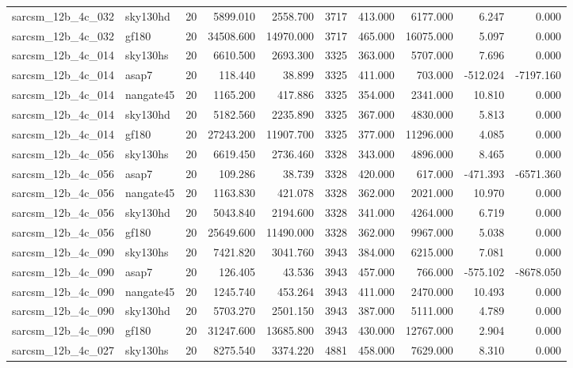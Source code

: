 \begin{tabular}{llrrrrrrrr}
sarcsm\_12b\_4c\_032 & sky130hd & 20 & 5899.010 & 2558.700 & 3717 & 413.000 & 6177.000 & 6.247 & 0.000 \\
sarcsm\_12b\_4c\_032 & gf180 & 20 & 34508.600 & 14970.000 & 3717 & 465.000 & 16075.000 & 5.097 & 0.000 \\
sarcsm\_12b\_4c\_014 & sky130hs & 20 & 6610.500 & 2693.300 & 3325 & 363.000 & 5707.000 & 7.696 & 0.000 \\
sarcsm\_12b\_4c\_014 & asap7 & 20 & 118.440 & 38.899 & 3325 & 411.000 & 703.000 & -512.024 & -7197.160 \\
sarcsm\_12b\_4c\_014 & nangate45 & 20 & 1165.200 & 417.886 & 3325 & 354.000 & 2341.000 & 10.810 & 0.000 \\
sarcsm\_12b\_4c\_014 & sky130hd & 20 & 5182.560 & 2235.890 & 3325 & 367.000 & 4830.000 & 5.813 & 0.000 \\
sarcsm\_12b\_4c\_014 & gf180 & 20 & 27243.200 & 11907.700 & 3325 & 377.000 & 11296.000 & 4.085 & 0.000 \\
sarcsm\_12b\_4c\_056 & sky130hs & 20 & 6619.450 & 2736.460 & 3328 & 343.000 & 4896.000 & 8.465 & 0.000 \\
sarcsm\_12b\_4c\_056 & asap7 & 20 & 109.286 & 38.739 & 3328 & 420.000 & 617.000 & -471.393 & -6571.360 \\
sarcsm\_12b\_4c\_056 & nangate45 & 20 & 1163.830 & 421.078 & 3328 & 362.000 & 2021.000 & 10.970 & 0.000 \\
sarcsm\_12b\_4c\_056 & sky130hd & 20 & 5043.840 & 2194.600 & 3328 & 341.000 & 4264.000 & 6.719 & 0.000 \\
sarcsm\_12b\_4c\_056 & gf180 & 20 & 25649.600 & 11490.000 & 3328 & 362.000 & 9967.000 & 5.038 & 0.000 \\
sarcsm\_12b\_4c\_090 & sky130hs & 20 & 7421.820 & 3041.760 & 3943 & 384.000 & 6215.000 & 7.081 & 0.000 \\
sarcsm\_12b\_4c\_090 & asap7 & 20 & 126.405 & 43.536 & 3943 & 457.000 & 766.000 & -575.102 & -8678.050 \\
sarcsm\_12b\_4c\_090 & nangate45 & 20 & 1245.740 & 453.264 & 3943 & 411.000 & 2470.000 & 10.493 & 0.000 \\
sarcsm\_12b\_4c\_090 & sky130hd & 20 & 5703.270 & 2501.150 & 3943 & 387.000 & 5111.000 & 4.789 & 0.000 \\
sarcsm\_12b\_4c\_090 & gf180 & 20 & 31247.600 & 13685.800 & 3943 & 430.000 & 12767.000 & 2.904 & 0.000 \\
sarcsm\_12b\_4c\_027 & sky130hs & 20 & 8275.540 & 3374.220 & 4881 & 458.000 & 7629.000 & 8.310 & 0.000 \\

\end{tabular}
